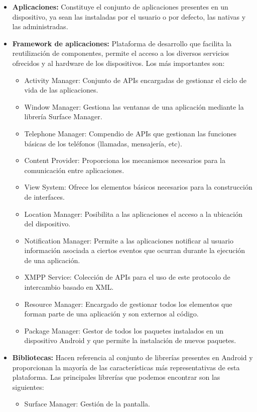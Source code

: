 \begin{itemize}
\item \textbf{Aplicaciones:} Constituye el conjunto de aplicaciones presentes en un dispositivo, ya sean las instaladas por el usuario o por defecto, las nativas y las administradas.
\item \textbf{Framework de aplicaciones:} Plataforma de desarrollo que facilita la reutilización de componentes, permite el acceso a los diversos servicios ofrecidos y al hardware de los dispositivos. Los más importantes son:
\begin{itemize}
\item Activity Manager: Conjunto de APIs encargadas de gestionar el ciclo de vida de las aplicaciones.
\item Window Manager: Gestiona las ventanas de una aplicación mediante la librería Surface Manager.
\item Telephone Manager: Compendio de APIs que gestionan las funciones básicas de los teléfonos (llamadas, mensajería, etc).
\item Content Provider: Proporciona los mecanismos necesarios para la comunicación entre aplicaciones.
\item View System: Ofrece los elementos básicos necesarios para la construcción de interfaces.
\item Location Manager: Posibilita a las aplicaciones el acceso a la ubicación del dispositivo.
\item Notification Manager: Permite a las aplicaciones notificar al usuario información asociada a ciertos eventos que ocurran durante la ejecución de una aplicación.
\item XMPP Service: Colección de APIs para el uso de este protocolo de intercambio basado en XML.
\item Resource Manager: Encargado de gestionar todos los elementos que forman parte de una aplicación y son externos al código.
\item Package Manager: Gestor de todos los paquetes instalados en un dispositivo Android y que permite la instalación de nuevos paquetes.
\end{itemize}
\item \textbf{Bibliotecas:} Hacen referencia al conjunto de librerías presentes en Android y proporcionan la mayoría de las características más representativas de esta plataforma. Las principales librerías que podemos encontrar son las siguientes:
\begin{itemize}
\item Surface Manager: Gestión de la pantalla.

\end{itemize}
\end{itemize}
